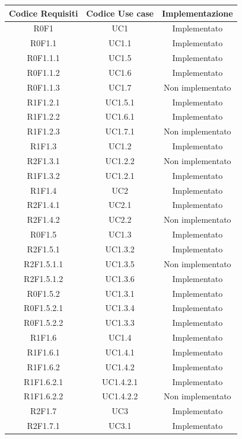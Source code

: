 \normalsize
\begin{longtable}{|c|c|c|}
	\hline
	\textbf{Codice Requisiti} & \textbf{Codice Use case} & \textbf{Implementazione} \\
	\hline
	\endhead
	R0F1 & UC1 & Implementato\\
	\hline
	R0F1.1 & UC1.1 & Implementato\\
	\hline
	R0F1.1.1 & UC1.5 & Implementato\\
	\hline
	R0F1.1.2 & UC1.6 & Implementato\\
	\hline
	R0F1.1.3 & UC1.7 & Non implementato\\
	\hline
	R1F1.2.1 & UC1.5.1 & Implementato\\
	\hline
	R1F1.2.2 & UC1.6.1 & Implementato\\
	\hline
	R1F1.2.3 & UC1.7.1 & Non implementato\\
	\hline
	R1F1.3 & UC1.2 & Implementato\\
	\hline
	R2F1.3.1 & UC1.2.2 & Non implementato\\
	\hline
	R1F1.3.2 & UC1.2.1 & Implementato\\
	\hline
	R1F1.4 & UC2 & Implementato\\
	\hline
	R2F1.4.1 & UC2.1 & Implementato\\
	\hline
	R2F1.4.2 & UC2.2 & Non implementato\\
	\hline
	R0F1.5 & UC1.3 & Implementato\\
	\hline
	R2F1.5.1 & UC1.3.2 & Implementato\\
	\hline
	R2F1.5.1.1 & UC1.3.5 & Non implementato\\
	\hline
	R2F1.5.1.2 & UC1.3.6 & Implementato\\
	\hline
	R0F1.5.2 & UC1.3.1 & Implementato\\
	\hline
	R0F1.5.2.1 & UC1.3.4 & Implementato\\
	\hline
	R0F1.5.2.2 & UC1.3.3 & Implementato\\
	\hline
	R1F1.6 & UC1.4 & Implementato\\
	\hline
	R1F1.6.1 & UC1.4.1 & Implementato\\
	\hline
	R1F1.6.2 & UC1.4.2 & Implementato\\
	\hline
	R1F1.6.2.1 & UC1.4.2.1 & Implementato\\
	\hline
	R1F1.6.2.2 & UC1.4.2.2 & Non implementato\\
	\hline
	R2F1.7 & UC3 & Implementato\\
	\hline
	R2F1.7.1 & UC3.1 & Implementato\\
	\hline

\end{longtable}
